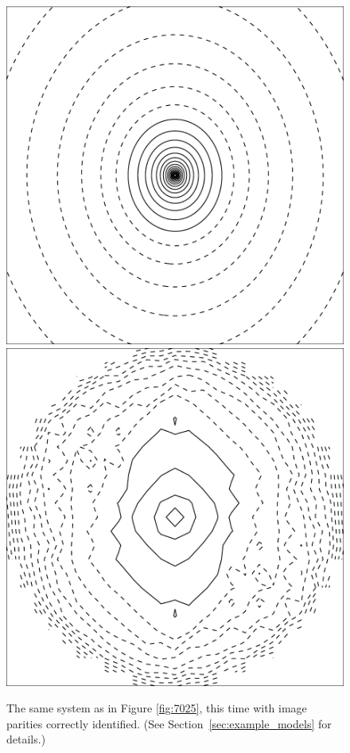 \documentclass[usenatbib]{mn2e}
\newcommand{\secref}[1]{Section~\ref{sec:#1}}
\newlength{\myplotswidth}
\begin{document}
\begin{figure}
  \includegraphics[width=\myplotswidth]{fig/ASW0000h2m_007022_kappa}
  \includegraphics[width=\myplotswidth]{fig/007022_mass}

  \caption[result 7022 (ASW0000h2m)]{The same system as in Figure
    \ref{fig:7025}, this time with image parities correctly
    identified. (See \secref{example_models} for details.)}
  \label{fig:7022}
\end{figure}
\end{document}
